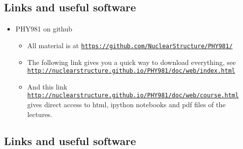 \documentclass[%
twoside,                 %
final,                   %
10pt]{article}
\begin{document}
\subsection*{Links and useful software}

\paragraph{}
\begin{itemize}
\item PHY981 on github
\begin{itemize}

 \item All material is at  \href{{https://github.com/NuclearStructure/PHY981/}}{\nolinkurl{https://github.com/NuclearStructure/PHY981/}}

 \item The following link gives you a quick way to download everything, see \href{{http://nuclearstructure.github.io/PHY981/doc/web/index.html}}{\nolinkurl{http://nuclearstructure.github.io/PHY981/doc/web/index.html}}

 \item And this link \href{{http://nuclearstructure.github.io/PHY981/doc/web/course.html}}{\nolinkurl{http://nuclearstructure.github.io/PHY981/doc/web/course.html}} gives direct access to html, ipython notebooks and pdf files of the lectures.
\end{itemize}

\noindent
\end{itemize}

\noindent




\subsection*{Links and useful software}

\end{document}
